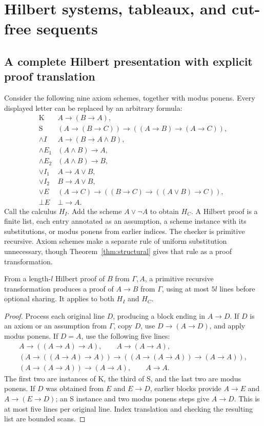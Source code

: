 \section{Hilbert systems, tableaux, and cut-free sequents}\label{sec:systems}

\subsection{A complete Hilbert presentation with explicit proof translation}

Consider the following nine axiom schemes, together with modus ponens.
Every displayed letter can be replaced by an arbitrary formula:
\[
\begin{array}{ll}
 \mathrm K&A\to(B\to A),\\
 \mathrm S&(A\to(B\to C))\to((A\to B)\to(A\to C)),\\
 \wedge I&A\to(B\to A\wedge B),\\
 \wedge E_1&(A\wedge B)\to A,\\
 \wedge E_2&(A\wedge B)\to B,\\
 \vee I_1&A\to A\vee B,\\
 \vee I_2&B\to A\vee B,\\
 \vee E&(A\to C)\to((B\to C)\to((A\vee B)\to C)),\\
 \bot E&\bot\to A.
\end{array}
\]
Call the calculus $H_I$. Add the scheme $A\vee\neg A$ to obtain $H_C$.
A Hilbert proof is a finite list, each entry annotated as an assumption, a
scheme instance with its substitutions, or modus ponens from earlier indices.
The checker is primitive recursive. Axiom schemes make a separate rule of
uniform substitution unnecessary, though Theorem~\ref{thm:structural} gives
that rule as a proof transformation.

\begin{lemma}\label{thm:hilbert-deduction}
From a length-$l$ Hilbert proof of $B$ from $\Gamma,A$, a primitive recursive
transformation produces a proof of $A\to B$ from $\Gamma$, using at most
$5l$ lines before optional sharing. It applies to both $H_I$ and $H_C$.
\end{lemma}
\begin{proof}
Process each original line $D$, producing a block ending in $A\to D$.
If $D$ is an axiom or an assumption from $\Gamma$, copy $D$, use
$D\to(A\to D)$, and apply modus ponens. If $D=A$, use the following five
lines:
\[
\begin{gathered}
 A\to((A\to A)\to A),\qquad A\to(A\to A),\\
 (A\to((A\to A)\to A))\to((A\to(A\to A))\to(A\to A)),\\
 (A\to(A\to A))\to(A\to A),\qquad A\to A.
\end{gathered}
\]
The first two are instances of K, the third of S, and the last two are
modus ponens. If $D$ was obtained from $E$ and $E\to D$, earlier blocks
provide $A\to E$ and $A\to(E\to D)$; an S instance and two modus ponens
steps give $A\to D$. This is at most five lines per original line.
Index translation and checking the resulting list are bounded scans.
\end{proof}

